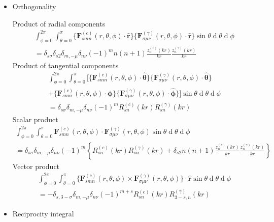 \documentclass[a4paper,12pt]{article}
\renewcommand{\vec}[1]{\boldsymbol{#1}}
\newcommand{\unitvec}[1]{\hat{\vec{#1}}}
\newcommand{\mrm}[1]{\mathrm{#1}}
\newcommand{\diff}{\operatorname{d}\!}
\newcommand{\iu}{\mrm{i}}
\newcommand{\eu}{\mrm{e}}
\newcommand{\Fv}{\vec{F}}
\newcommand{\Kv}{\vec{K}}
\newcommand{\ruv}{\unitvec{r}}
\newcommand{\thetauv}{\unitvec{\theta}}
\newcommand{\phiuv}{\unitvec{\phi}}
\begin{document}
\begin{itemize}
  \begin{align}
    \Kv_{smn}(\theta,\phi) &= \lim_{kr\rightarrow\infty} \left\{ \sqrt{4\pi}\frac{kr}{\eu^{\iu kr}} \Fv_{smn}^{(3)}(r,\theta,\phi) \right\} \\
    \Kv_{1mn}(\theta,\phi) &= \sqrt{\frac{2}{n(n+1)}} \left(-\frac{m}{|m|}\right)^{m} \eu^{\iu m\phi} (-\iu)^{n+1} \left\{ \frac{\iu m\bar{P}_{n}^{|m|}(\cos\theta)}{\sin\theta}\thetauv - \frac{\diff\bar{P}_{n}^{|m|}(\cos\theta)}{\diff\theta}\phiuv \right\} \\
    \Kv_{2mn}(\theta,\phi) &= \sqrt{\frac{2}{n(n+1)}} \left(-\frac{m}{|m|}\right)^{m} \eu^{\iu m\phi} (-\iu)^{n} \left\{ \frac{\diff\bar{P}_{n}^{|m|}(\cos\theta)}{\diff\theta}\thetauv + \frac{\iu m\bar{P}_{n}^{|m|}(\cos\theta)}{\sin\theta}\phiuv \right\} 
  \end{align}
\item Orthogonality

  Product of radial components
  \begin{multline}
    \int_{\phi=0}^{2\pi}\int_{\theta=0}^{\pi} \{\Fv_{smn}^{(c)}(r,\theta,\phi)\cdot\ruv\} \{\Fv_{\sigma\mu\nu}^{(\gamma)}(r,\theta,\phi)\cdot\ruv\} \sin\theta\diff\theta\diff\phi \\
    = \delta_{s\sigma}\delta_{s2}\delta_{m,-\mu}\delta_{n\nu}(-1)^{m}n(n+1)\frac{z_{n}^{(c)}(kr)}{kr}\frac{z_{n}^{(\gamma)}(kr)}{kr}
  \end{multline}
  Product of tangential components
  \begin{multline}
    \int_{\phi=0}^{2\pi}\int_{\theta=0}^{\pi} \Big[ \{\Fv_{smn}^{(c)}(r,\theta,\phi)\cdot\thetauv\} \{\Fv_{\sigma\mu\nu}^{(\gamma)}(r,\theta,\phi)\cdot\thetauv\} \\
    + \{\Fv_{smn}^{(c)}(r,\theta,\phi)\cdot\phiuv\} \{\Fv_{\sigma\mu\nu}^{(\gamma)}(r,\theta,\phi)\cdot\phiuv\} \Big] \sin\theta\diff\theta\diff\phi \\
    = \delta_{s\sigma}\delta_{m,-\mu}\delta_{n\nu}(-1)^{m}R_{sn}^{(c)}(kr)R_{sn}^{(\gamma)}(kr)
    \label{eq:orthotang}
  \end{multline}
  Scalar product
  \begin{multline}
    \int_{\phi=0}^{2\pi}\int_{\theta=0}^{\pi} \Fv_{smn}^{(c)}(r,\theta,\phi) \cdot \Fv_{\sigma\mu\nu}^{(\gamma)}(r,\theta,\phi) \sin\theta\diff\theta\diff\phi \\
    = \delta_{s\sigma}\delta_{m,-\mu}\delta_{n\nu}(-1)^{m} \left\{ R_{sn}^{(c)}(kr)R_{sn}^{(\gamma)}(kr) + \delta_{s2}n(n+1)\frac{z_{n}^{(c)}(kr)}{kr}\frac{z_{n}^{(\gamma)}(kr)}{kr} \right\}
  \end{multline}
  Vector product  
  \begin{multline}
    \int_{\phi=0}^{2\pi}\int_{\theta=0}^{\pi} \{ \Fv_{smn}^{(c)}(r,\theta,\phi) \times \Fv_{\sigma\mu\nu}^{(\gamma)}(r,\theta,\phi) \} \cdot \ruv \sin\theta\diff\theta\diff\phi \\
    = -\delta_{s,3-\sigma}\delta_{m,-\mu}\delta_{n\nu}(-1)^{m+s} R_{sn}^{(c)}(kr)R_{3-s,n}^{(\gamma)}(kr)
  \end{multline}
\item Reciprocity integral


\end{itemize}
\end{document}
